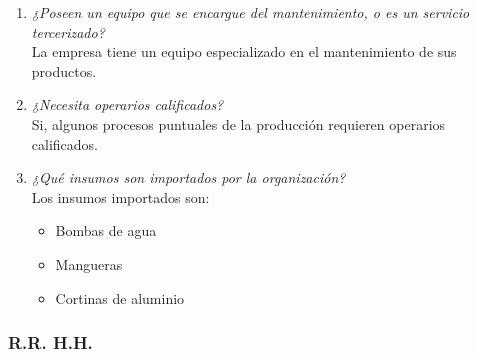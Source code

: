 \documentclass[a4paper,10pt]{article}
\begin{document}
\begin{enumerate}[resume]
				\item \textit{¿Poseen un equipo que se encargue del mantenimiento, o es un servicio tercerizado?}\\	
				La empresa tiene un equipo especializado en el mantenimiento de sus productos.
				
				\item \textit{¿Necesita operarios calificados?}\\	
				Si, algunos procesos puntuales de la producción requieren operarios calificados.
				
				\item \textit{¿Qué insumos son importados por la organización?}\\	
				Los insumos importados son:
				\begin{itemize}
					\item Bombas de agua
					\item Mangueras
					\item Cortinas de aluminio
				\end{itemize}
			
			\end{enumerate}			
			
	\subsubsection{R.R. H.H.}
		
\end{document}
